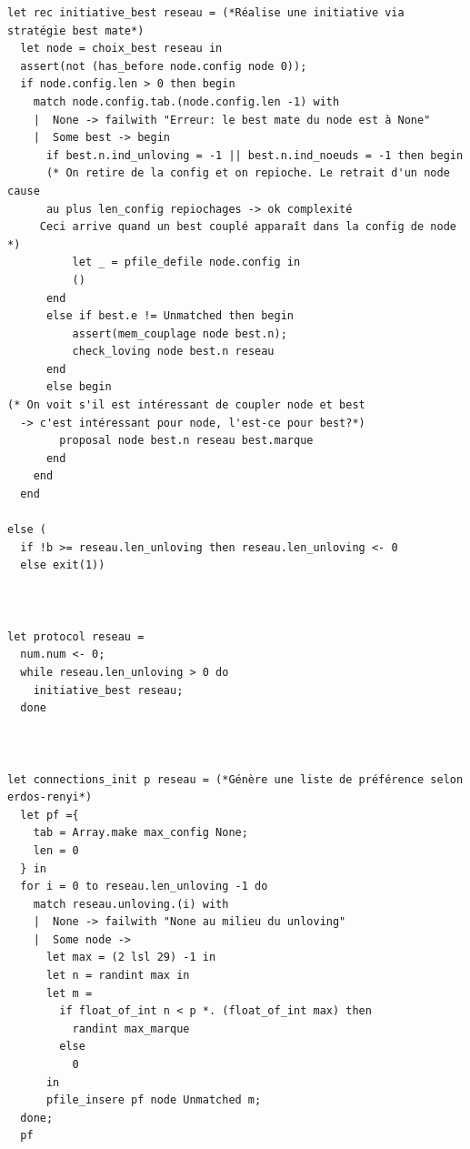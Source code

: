 \documentclass[12pt,a4paper]{article}
\begin{document}
\begin{verbatim}
let rec initiative_best reseau = (*Réalise une initiative via stratégie best mate*)
  let node = choix_best reseau in
  assert(not (has_before node.config node 0));
  if node.config.len > 0 then begin
    match node.config.tab.(node.config.len -1) with
    |  None -> failwith "Erreur: le best mate du node est à None"
    |  Some best -> begin 
      if best.n.ind_unloving = -1 || best.n.ind_noeuds = -1 then begin
      (* On retire de la config et on repioche. Le retrait d'un node cause 
      au plus len_config repiochages -> ok complexité
     Ceci arrive quand un best couplé apparaît dans la config de node *)
          let _ = pfile_defile node.config in 
          ()
      end
      else if best.e != Unmatched then begin
          assert(mem_couplage node best.n);
          check_loving node best.n reseau
      end
      else begin   
(* On voit s'il est intéressant de coupler node et best 
  -> c'est intéressant pour node, l'est-ce pour best?*)
        proposal node best.n reseau best.marque
      end
    end
  end

else (
  if !b >= reseau.len_unloving then reseau.len_unloving <- 0
  else exit(1))



let protocol reseau = 
  num.num <- 0;
  while reseau.len_unloving > 0 do 
    initiative_best reseau;
  done



let connections_init p reseau = (*Génère une liste de préférence selon erdos-renyi*)
  let pf ={
    tab = Array.make max_config None;
    len = 0
  } in
  for i = 0 to reseau.len_unloving -1 do 
    match reseau.unloving.(i) with 
    |  None -> failwith "None au milieu du unloving"
    |  Some node -> 
      let max = (2 lsl 29) -1 in 
      let n = randint max in 
      let m = 
        if float_of_int n < p *. (float_of_int max) then 
          randint max_marque
        else
          0
      in
      pfile_insere pf node Unmatched m;
  done;
  pf 
  
\end{verbatim}

  
\end{document}
